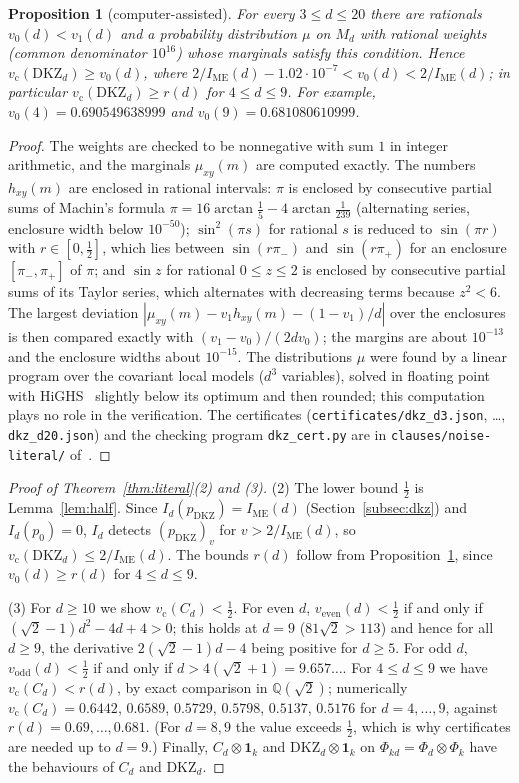 \documentclass[11pt]{amsart}
\newtheorem{proposition}[theorem]{Proposition}
\theoremstyle{definition}
\theoremstyle{remark}
\numberwithin{equation}{section}
\newcommand{\IME}{I_{\mathrm{ME}}}
\newcommand{\one}{\mathbf{1}}
\newcommand{\Q}{\mathbb{Q}}
\newcommand{\vc}{v_{\mathrm c}}
\newcommand{\veven}{v_{\mathrm{even}}}
\newcommand{\vodd}{v_{\mathrm{odd}}}
\newcommand{\DKZ}{\mathrm{DKZ}}
\begin{document}
\begin{proposition}[computer-assisted]\label{prop:dkzcert}
For every $3\le d\le20$ there are rationals $v_0(d)<v_1(d)$ and a probability distribution $\mu$ on $M_d$ with rational
weights (common denominator $10^{16}$) whose marginals satisfy this condition. Hence $\vc(\DKZ_d)\ge v_0(d)$, where
$2/\IME(d)-1.02\cdot10^{-7}<v_0(d)<2/\IME(d)$; in particular $\vc(\DKZ_d)\ge r(d)$ for $4\le d\le9$. For example,
$v_0(4)=0.690549638999$ and $v_0(9)=0.681080610999$.
\end{proposition}

\begin{proof}
The weights are checked to be nonnegative with sum $1$ in integer arithmetic, and the marginals $\mu_{xy}(m)$ are
computed exactly. The numbers $h_{xy}(m)$ are enclosed in rational intervals: $\pi$ is enclosed by consecutive partial
sums of Machin's formula $\pi=16\arctan\frac15-4\arctan\frac1{239}$ (alternating series, enclosure width below
$10^{-50}$); $\sin^2(\pi s)$ for rational $s$ is reduced to $\sin(\pi r)$ with $r\in[0,\frac12]$, which lies between
$\sin(r\pi_-)$ and $\sin(r\pi_+)$ for an enclosure $[\pi_-,\pi_+]$ of $\pi$; and $\sin z$ for rational $0\le z\le2$ is
enclosed by consecutive partial sums of its Taylor series, which alternates with decreasing terms because $z^2<6$. The
largest deviation $|\mu_{xy}(m)-v_1h_{xy}(m)-(1-v_1)/d|$ over the enclosures is then compared exactly with
$(v_1-v_0)/(2dv_0)$; the margins are about $10^{-13}$ and the enclosure widths about $10^{-15}$. The distributions
$\mu$ were found by a linear program over the covariant local models ($d^3$ variables), solved in floating point
with HiGHS~\cite{HiGHS} slightly below its optimum and then rounded; this computation plays no role in the verification.
The certificates (\texttt{certificates/dkz\_d3.json}, \dots, \texttt{dkz\_d20.json}) and the checking program
\texttt{dkz\_cert.py} are in \texttt{clauses/noise-literal/} of~\cite{repo-oqp27}.
\end{proof}

\begin{proof}[Proof of Theorem~\ref{thm:literal}(2) and (3)]
(2) The lower bound $\frac12$ is Lemma~\ref{lem:half}. Since $I_d(p_{\DKZ})=\IME(d)$ (Section~\ref{subsec:dkz}) and
$I_d(p_0)=0$, $I_d$ detects $(p_{\DKZ})_v$ for $v>2/\IME(d)$, so $\vc(\DKZ_d)\le2/\IME(d)$. The bounds $r(d)$ follow from
Proposition~\ref{prop:dkzcert}, since $v_0(d)\ge r(d)$ for $4\le d\le9$.

(3) For $d\ge10$ we show $\vc(C_d)<\frac12$. For even $d$, $\veven(d)<\frac12$ if and only if $(\sqrt2-1)d^2-4d+4>0$;
this holds at $d=9$ ($81\sqrt2>113$) and hence for all $d\ge9$, the derivative $2(\sqrt2-1)d-4$ being positive for
$d\ge5$. For odd $d$, $\vodd(d)<\frac12$ if and only if $d>4(\sqrt2+1)=9.657\ldots$. For $4\le d\le9$ we have
$\vc(C_d)<r(d)$, by exact comparison in $\Q(\sqrt2)$; numerically $\vc(C_d)=0.6442$, $0.6589$, $0.5729$, $0.5798$,
$0.5137$, $0.5176$ for $d=4,\dots,9$, against $r(d)=0.69,\dots,0.681$. (For $d=8,9$ the value exceeds $\frac12$, which is
why certificates are needed up to $d=9$.) Finally, $C_d\otimes\one_k$ and $\DKZ_d\otimes\one_k$ on
$\Phi_{kd}=\Phi_d\otimes\Phi_k$ have the behaviours of $C_d$ and $\DKZ_d$.
\end{proof}
\end{document}
